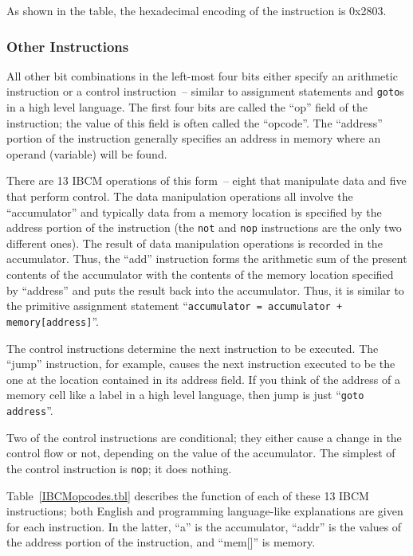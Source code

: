 As shown in the table, the hexadecimal encoding of the instruction is 0x2803.

\subsubsection{Other Instructions}

All other bit combinations in the left-most four bits either specify
an arithmetic instruction or a control instruction~-- similar to
assignment statements and {\tt goto}s in a high level language. The first four
bits are called the ``op'' field of the instruction; the value of this
field is often called the ``opcode''. The ``address'' portion of the
instruction generally specifies an address in memory where an operand
(variable) will be found.

There are 13 IBCM operations of this form~-- eight that manipulate
data and five that perform control. The data manipulation operations
all involve the ``accumulator'' and typically data from a memory
location is specified by the address portion of the instruction (the
{\tt not} and {\tt nop} instructions are the only two different ones).
The result of data manipulation operations is recorded in the
accumulator.  Thus, the ``add'' instruction forms the arithmetic sum
of the present contents of the accumulator with the contents of the
memory location specified by ``address'' and puts the result back into
the accumulator. Thus, it is similar to the primitive assignment
statement ``{\tt accumulator = accumulator + memory[address]}''.

The control instructions determine the next instruction to be
executed. The ``jump'' instruction, for example, causes the next
instruction executed to be the one at the location contained in its
address field. If you think of the address of a memory cell like a
label in a high level language, then jump is just ``{\tt goto
  address}''.

Two of the control instructions are conditional; they either cause a
change in the control flow or not, depending on the value of the
accumulator. The simplest of the control instruction is {\tt nop}; it
does nothing.

Table~\ref{IBCMopcodes.tbl} describes the function of each of these 13
IBCM instructions; both English and programming language-like
explanations are given for each instruction. In the latter, ``a'' is
the accumulator, ``addr'' is the values of the address portion of the
instruction, and ``mem[]'' is memory.

